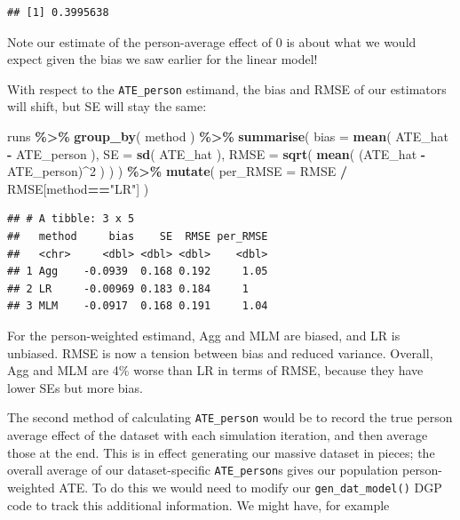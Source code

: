 \documentclass[
]{book}
\newenvironment{Shaded}{\begin{snugshade}}{\end{snugshade}}
\newcommand{\AttributeTok}[1]{\textcolor[rgb]{0.13,0.29,0.53}{#1}}
\newcommand{\DecValTok}[1]{\textcolor[rgb]{0.00,0.00,0.81}{#1}}
\newcommand{\FunctionTok}[1]{\textcolor[rgb]{0.13,0.29,0.53}{\textbf{#1}}}
\newcommand{\NormalTok}[1]{#1}
\newcommand{\SpecialCharTok}[1]{\textcolor[rgb]{0.81,0.36,0.00}{\textbf{#1}}}
\newcommand{\StringTok}[1]{\textcolor[rgb]{0.31,0.60,0.02}{#1}}
\begin{document}
\begin{verbatim}
## [1] 0.3995638
\end{verbatim}

Note our estimate of the person-average effect of 0 is about what we would expect given the bias we saw earlier for the linear model!

With respect to the \texttt{ATE\_person} estimand, the bias and RMSE of our estimators will shift, but SE will stay the same:

\begin{Shaded}
\begin{Highlighting}[]
\NormalTok{runs }\SpecialCharTok{\%\textgreater{}\%} 
  \FunctionTok{group\_by}\NormalTok{( method ) }\SpecialCharTok{\%\textgreater{}\%}
  \FunctionTok{summarise}\NormalTok{( }
    \AttributeTok{bias =} \FunctionTok{mean}\NormalTok{( ATE\_hat }\SpecialCharTok{{-}}\NormalTok{ ATE\_person ),}
    \AttributeTok{SE =} \FunctionTok{sd}\NormalTok{( ATE\_hat ),}
    \AttributeTok{RMSE =} \FunctionTok{sqrt}\NormalTok{( }\FunctionTok{mean}\NormalTok{( (ATE\_hat }\SpecialCharTok{{-}}\NormalTok{ ATE\_person)}\SpecialCharTok{\^{}}\DecValTok{2}\NormalTok{ ) )}
\NormalTok{  ) }\SpecialCharTok{\%\textgreater{}\%}
  \FunctionTok{mutate}\NormalTok{( }\AttributeTok{per\_RMSE =}\NormalTok{ RMSE }\SpecialCharTok{/}\NormalTok{ RMSE[method}\SpecialCharTok{==}\StringTok{"LR"}\NormalTok{] )}
\end{Highlighting}
\end{Shaded}

\begin{verbatim}
## # A tibble: 3 x 5
##   method     bias    SE  RMSE per_RMSE
##   <chr>     <dbl> <dbl> <dbl>    <dbl>
## 1 Agg    -0.0939  0.168 0.192     1.05
## 2 LR     -0.00969 0.183 0.184     1   
## 3 MLM    -0.0917  0.168 0.191     1.04
\end{verbatim}

For the person-weighted estimand, Agg and MLM are biased, and LR is unbiased.
RMSE is now a tension between bias and reduced variance.
Overall, Agg and MLM are 4\% worse than LR in terms of RMSE, because they have lower SEs but more bias.

The second method of calculating \texttt{ATE\_person} would be to record the true person average effect of the dataset with each simulation iteration, and then average those at the end. This is in effect generating our massive dataset in pieces; the overall average of our dataset-specific \texttt{ATE\_person}s gives our population person-weighted ATE.
To do this we would need to modify our \texttt{gen\_dat\_model()} DGP code to track this additional information.
We might have, for example
\end{document}
